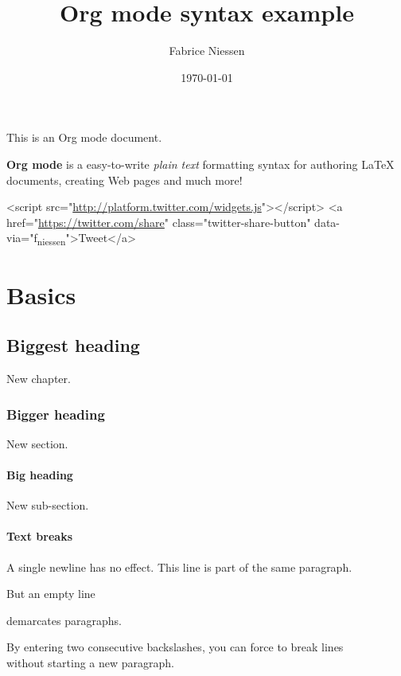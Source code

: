 \documentclass[11pt]{article}
\author{Fabrice Niessen}
\date{\today}
\title{Org mode syntax example}
\begin{document}
\maketitle
\setcounter{tocdepth}{2}
\tableofcontents

This is an Org mode document.

\textbf{Org mode} is a easy-to-write \emph{plain text} formatting syntax for authoring \LaTeX{}
documents, creating Web pages and much more!

\begin{html}
<script src="\url{http://platform.twitter.com/widgets.js}"></script>
<a href="\url{https://twitter.com/share}" class="twitter-share-button" data-via="f\textsubscript{niessen}">Tweet</a>
\end{html}

\section*{Basics}
\label{sec:org0df0039}

\subsection*{Biggest heading}
\label{sec:org6289322}

New chapter.

\subsubsection*{Bigger heading}
\label{sec:org0a1c795}

New section.

\paragraph*{Big heading}
\label{sec:org3a92b3f}

New sub-section.

\paragraph*{Text breaks}
\label{sec:org7655a77}

A single newline has no effect.
This line is part of the same paragraph.

But an empty line

demarcates paragraphs.

By entering two consecutive backslashes,
you can force to break lines \\[0pt]
without starting a new paragraph.
\end{document}
